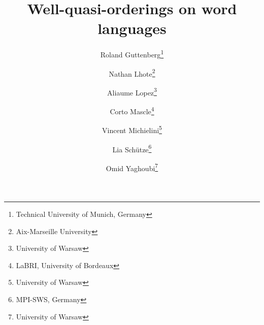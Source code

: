 %

\title{Well-quasi-orderings on word languages}
\author{%
        Roland Guttenberg\thanks{Technical University of Munich,
Germany}
     \and
        Nathan Lhote\thanks{Aix-Marseille University}
     \and
        Aliaume Lopez\thanks{University of Warsaw}
     \and
        Corto Mascle\thanks{LaBRI, University of Bordeaux}
     \and
        Vincent Michielini\thanks{University of Warsaw}
     \and
        Lia Schütze\thanks{MPI-SWS, Germany}
     \and
        Omid Yaghoubi\thanks{University of Warsaw}
    }


\newcommand{\makeabstract}{
\begin{abstract}
    The set of finite words over a well-quasi-ordered set is itself
    well-quasi-ordered. This seminal result by Higman is a cornerstone
    of the theory of well-quasi-orderings and has found numerous
    applications in computer science. However, this result is based on a
    specific choice of ordering on words, the (scattered) subword
    ordering. In this paper, we describe to what extent other natural
    orderings (prefix, suffix, infix) on words can be used to derive
    Higman-like theorems. More specifically, we are interested in
    characterizing \emph{languages} of words that are well-quasi-ordered
    under these orderings. We show that a simple characterization is
    possible for the prefix and suffix orderings, and that under extra
    regularity assumptions, this also lifts to the infix ordering.
\end{abstract}
}
